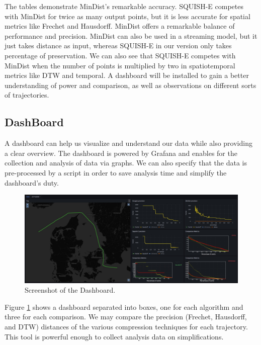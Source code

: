 The tables  demonstrate MinDist's remarkable accuracy. SQUISH-E competes with MinDist for twice as many output points, but it is less accurate for spatial metrics like Frechet and Hausdorff. MinDist offers a remarkable balance of performance and precision. MinDist can also be used in a streaming model, but it just takes distance as input, whereas SQUISH-E in our version only takes percentage of preservation. We can also see that SQUISH-E competes with MinDist when the number of points is multiplied by two in spatiotemporal metrics like DTW and temporal. A dashboard will be installed to gain a better understanding of power and comparison, as well as observations on different sorts of trajectories.

\subsection{DashBoard}

A dashboard can help us visualize and understand our data while also providing a clear overview. The dashboard is powered by Grafana and enables for the collection and analysis of data via graphs. We can also specify that the data is pre-processed by a script in order to save analysis time and simplify the dashboard's duty.

\begin{figure}
	\centering
	\includegraphics[width=1\linewidth]{figures/Stats/DashBoard3.jpg}
	\caption{Screenshot of the Dashboard. }
	\label{fig:dash}
\end{figure}

Figure \ref{fig:dash} shows a dashboard separated into boxes, one for each algorithm and three for each comparison.  We may compare the precision (Frechet, Hausdorff, and DTW) distances of the various compression techniques for each trajectory. This tool is powerful enough to collect analysis data on simplifications.  


